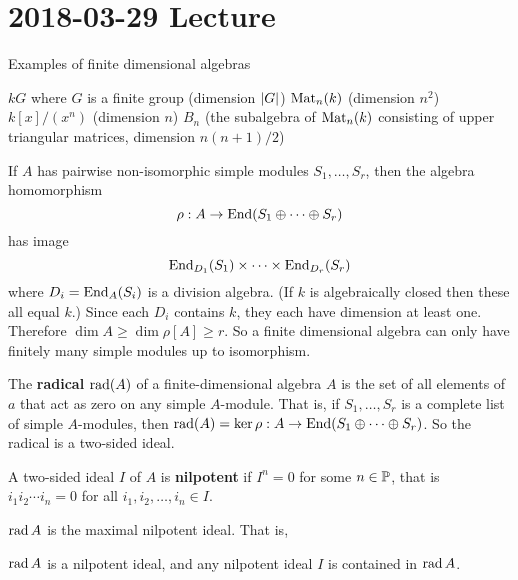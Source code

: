 \section{2018-03-29 Lecture}

\begin{exam}
	Examples of finite dimensional algebras
    \begin{enum}
    	\io $kG$ where $G$ is a finite group (dimension $\left\lvert G \right\rvert$)
        \io $\operatorname{Mat}_n(k)$ (dimension $n^2$)
        \io $k[x]/(x^n)$ (dimension $n$)
        \io $B_n$ (the subalgebra of $\operatorname{Mat}_n(k)$ consisting of upper triangular matrices, dimension $n(n+1)/2$)
    \end{enum}
\end{exam}

\begin{cor}\label{cor:density}
	If $A$ has pairwise non-isomorphic simple modules $S_1,\ldots,S_r$, then the algebra homomorphism
    \[\rho:A \to \operatorname{End}(S_1 \oplus \cdots \oplus S_r)\]
    has image
    \[\operatorname{End}_{D_1}(S_1) \times \cdots \times \operatorname{End}_{D_r}(S_r)\]
    where $D_i = \operatorname{End}_A(S_i)$ is a division algebra.
    (If $k$ is algebraically closed then these all equal $k$.)
    Since each $D_i$ contains $k$, they each have dimension at least one.
    Therefore $\dim A \geq \dim \rho[A] \geq r$.
    So a finite dimensional algebra can only have finitely many simple modules up to isomorphism.
\end{cor}

\begin{defn}
	The \textbf{radical} $\operatorname{rad}(A)$ of a finite-dimensional algebra $A$ is the set of all elements of $a$ that act as zero on any simple $A$-module.
    That is, if $S_1,\ldots,S_r$ is a complete list of simple $A$-modules, then $\operatorname{rad}(A) = \ker \rho: A \to \operatorname{End}(S_1 \oplus \cdots \oplus S_r)$.
    So the radical is a two-sided ideal.
\end{defn}

\begin{defn}
	A two-sided ideal $I$ of $A$ is \textbf{nilpotent} if $I^n=0$ for some $n \in \mathbb{P}$, that is $i_1i_2\cdots i_n=0$ for all $i_1,i_2,\ldots,i_n \in I$.
\end{defn}

\begin{prop}
	$\operatorname{rad} A$ is the maximal nilpotent ideal.
    That is,
    \begin{enum}
    	\io $\operatorname{rad} A$ is a nilpotent ideal, and
        \io any nilpotent ideal $I$ is contained in $\operatorname{rad} A$.
    \end{enum}
\end{prop}

